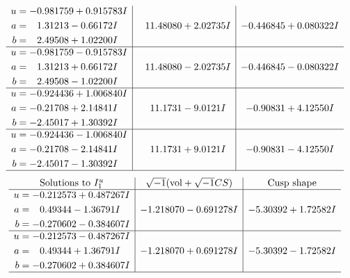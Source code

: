 \documentclass[1p]{elsarticle_modified}
\theoremstyle{definition}
\newcommand{\I}{\sqrt{-1}}
\begin{document}
$$\begin{array}{c|c|c}
\begin{aligned}
u &= -0.981759 + 0.915783 I \\
a &= \phantom{-}1.31213 - 0.66172 I \\
b &= \phantom{-}2.49508 + 1.02200 I\end{aligned}
 & \phantom{-}11.48080 + 2.02735 I & -0.446845 + 0.080322 I \\ \hline\begin{aligned}
u &= -0.981759 - 0.915783 I \\
a &= \phantom{-}1.31213 + 0.66172 I \\
b &= \phantom{-}2.49508 - 1.02200 I\end{aligned}
 & \phantom{-}11.48080 - 2.02735 I & -0.446845 - 0.080322 I \\ \hline\begin{aligned}
u &= -0.924436 + 1.006840 I \\
a &= -0.21708 + 2.14841 I \\
b &= -2.45017 + 1.30392 I\end{aligned}
 & \phantom{-}11.1731 - 9.0121 I & -0.90831 + 4.12550 I \\ \hline\begin{aligned}
u &= -0.924436 - 1.006840 I \\
a &= -0.21708 - 2.14841 I \\
b &= -2.45017 - 1.30392 I\end{aligned}
 & \phantom{-}11.1731 + 9.0121 I & -0.90831 - 4.12550 I\\
 \hline 
 \end{array}$$\newpage$$\begin{array}{c|c|c}  
\text{Solutions to }I^u_{1}& \I (\text{vol} + \sqrt{-1}CS) & \text{Cusp shape}\\
 \hline 
\begin{aligned}
u &= -0.212573 + 0.487267 I \\
a &= \phantom{-}0.49344 - 1.36791 I \\
b &= -0.270602 - 0.384607 I\end{aligned}
 & -1.218070 - 0.691278 I & -5.30392 + 1.72582 I \\ \hline\begin{aligned}
u &= -0.212573 - 0.487267 I \\
a &= \phantom{-}0.49344 + 1.36791 I \\
b &= -0.270602 + 0.384607 I\end{aligned}
 & -1.218070 + 0.691278 I & -5.30392 - 1.72582 I\\
 \hline 
 \end{array}$$\newpage\newpage\renewcommand{\arraystretch}{1}
\end{document}
